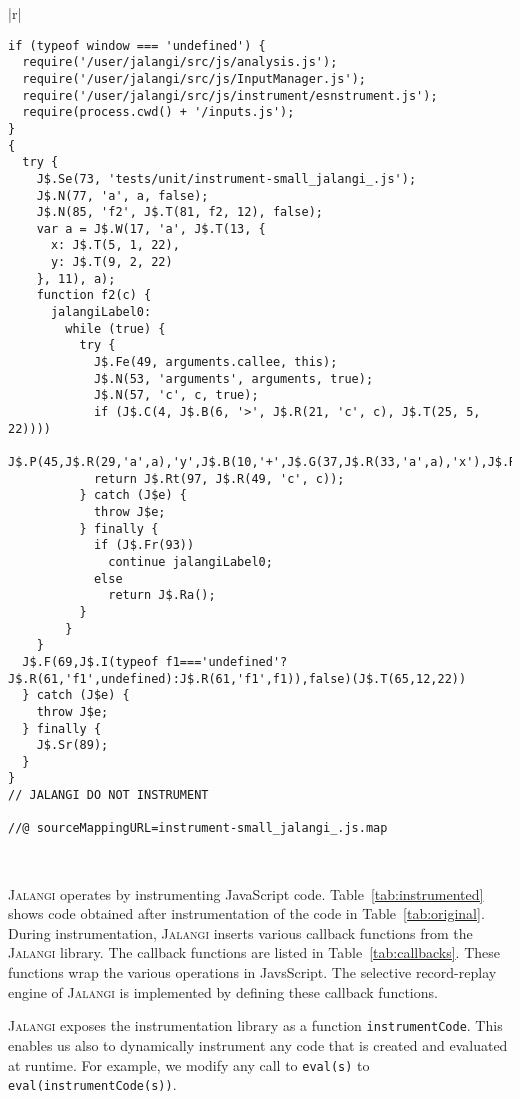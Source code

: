 \documentclass{sig-alternate}
\def\jalangi{\textsc{Jalangi}}
\begin{document}
\begin{table*}
\begin{tabular}{|r|}
\hline\\
{\scriptsize
\begin{lstlisting}
if (typeof window === 'undefined') {
  require('/user/jalangi/src/js/analysis.js');
  require('/user/jalangi/src/js/InputManager.js');
  require('/user/jalangi/src/js/instrument/esnstrument.js');
  require(process.cwd() + '/inputs.js');
}
{
  try {
    J$.Se(73, 'tests/unit/instrument-small_jalangi_.js');
    J$.N(77, 'a', a, false);
    J$.N(85, 'f2', J$.T(81, f2, 12), false);
    var a = J$.W(17, 'a', J$.T(13, {
      x: J$.T(5, 1, 22),
      y: J$.T(9, 2, 22)
    }, 11), a);
    function f2(c) {
      jalangiLabel0:
        while (true) {
          try {
            J$.Fe(49, arguments.callee, this);
            J$.N(53, 'arguments', arguments, true);
            J$.N(57, 'c', c, true);
            if (J$.C(4, J$.B(6, '>', J$.R(21, 'c', c), J$.T(25, 5, 22))))
              J$.P(45,J$.R(29,'a',a),'y',J$.B(10,'+',J$.G(37,J$.R(33,'a',a),'x'),J$.R(41,'c',c)));
            return J$.Rt(97, J$.R(49, 'c', c));
          } catch (J$e) {
            throw J$e;
          } finally {
            if (J$.Fr(93))
              continue jalangiLabel0;
            else
              return J$.Ra();
          }
        }
    }
  J$.F(69,J$.I(typeof f1==='undefined'?J$.R(61,'f1',undefined):J$.R(61,'f1',f1)),false)(J$.T(65,12,22))
  } catch (J$e) {
    throw J$e;
  } finally {
    J$.Sr(89);
  }
}
// JALANGI DO NOT INSTRUMENT

//@ sourceMappingURL=instrument-small_jalangi_.js.map
\end{lstlisting}
}\\
\hline
\end{tabular}
\caption{After Instrumentation of  Code in Table~\ref{tab:original}}
\label{tab:instrumented}
\end{table*}

\jalangi{} operates by instrumenting JavaScript code.
Table~\ref{tab:instrumented} shows code obtained after instrumentation
of the code in Table~\ref{tab:original}.  During instrumentation,
\jalangi{} inserts various callback functions from the \jalangi{}
library.  The callback functions are listed in
Table~\ref{tab:callbacks}.  These functions wrap the various
operations in JavsScript.  The selective record-replay engine of
\jalangi{} is implemented by defining these callback functions.

\jalangi{} exposes the instrumentation library as a function
\texttt{instrumentCode}.  This enables us also to dynamically
instrument any code that is created and evaluated at runtime.  For
example, we modify any call to \texttt{eval(s)} to
\texttt{eval(instrumentCode(s))}.  
\end{document}
